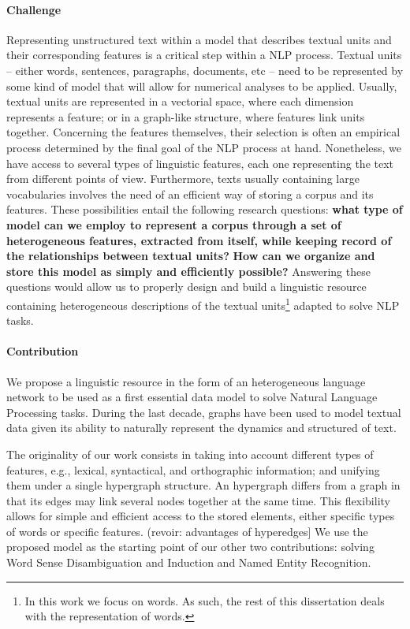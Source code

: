 \paragraph{Challenge}
Representing unstructured text within a model that describes textual units and their corresponding features is a critical step within a NLP process. Textual units -- either words, sentences, paragraphs, documents, etc -- need to be represented by some kind of model that will allow for numerical analyses to be applied. Usually, textual units are represented in a vectorial space, where each dimension represents a feature; or in a graph-like structure, where features link units together. Concerning the features themselves, their selection is often an empirical process determined  by the final goal of the NLP process at hand. Nonetheless,  we have access to several types of linguistic features, each one representing the text from different points of view.  Furthermore, texts usually containing large vocabularies involves the need of an efficient way of storing a corpus and its features. These possibilities entail the following research questions: \textbf{what type of model can we employ to represent a corpus through a set of heterogeneous features, extracted from itself, while keeping record of the relationships between textual units?} \textbf{How can we organize and store this model as simply and efficiently possible?} Answering these questions would allow us to  properly design and build a linguistic resource containing heterogeneous descriptions of the textual units\footnote{In this work we focus on words. As such, the rest of this dissertation deals with the representation of words.} adapted to solve NLP tasks.


\paragraph{Contribution}
We propose a linguistic resource in the form of an heterogeneous language network to be used as a first essential data model to solve Natural Language Processing tasks. 
During the last decade, graphs have been used to model textual data given its ability to naturally represent the dynamics and structured of text.

The originality of our work consists in taking into account different types of features, e.g., lexical, syntactical, and orthographic information; and unifying them under a single hypergraph structure. An hypergraph differs from a graph in that its edges may link several nodes together at the same time. This flexibility allows for simple and efficient access to the stored elements, either specific types of words or specific features. (revoir: advantages of hyperedges]
%
We use the proposed model as the starting point of our other two contributions: solving Word Sense Disambiguation and Induction and Named Entity Recognition. 

